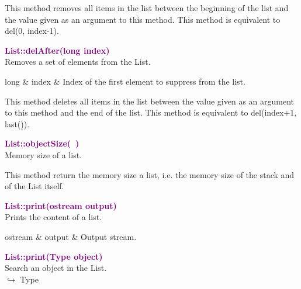 This method removes all items in the list between the beginning of the list and the value given as an argument to this method.
This method is equivalent to del(0, index-1).

\textcolor{purple}{\textbf{List::delAfter(long index)}}\label{List::delAfter(long index)}\\
Removes a set of elements from the List.

\begin{tcolorbox}[width=\textwidth,myArgs,tabularx={ll|R}]
long & index & Index of the first element to suppress from the list.
\end{tcolorbox}

This method deletes all items in the list between the value given as an argument to this method and the end of the list.
This method is equivalent to del(index+1, last()).

\textcolor{purple}{\textbf{List::objectSize(~)}}\label{List::objectSize()}\\
Memory size of a list.

This method return the memory size a list, i.e. the memory size of the stack and of the List itself.

\textcolor{purple}{\textbf{List::print(ostream output)}}\label{List::print(ostream output)}\\
Prints the content of a list.

\begin{tcolorbox}[width=\textwidth,myArgs,tabularx={ll|R}]
ostream & output & Output stream.
\end{tcolorbox}


\textcolor{purple}{\textbf{List::print(Type object)}}\label{List::print(Type object)}\\
Search an object in the List.\\ \hspace*{10mm}$\hookrightarrow$ Type

